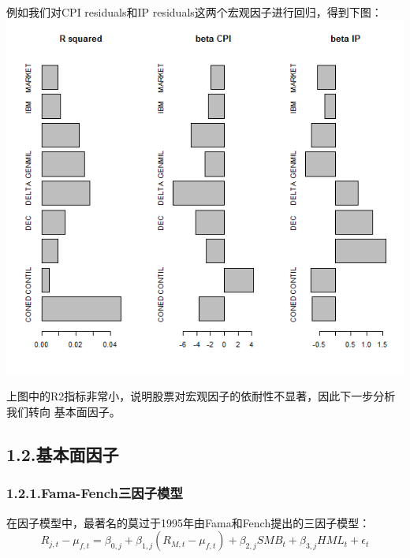 \documentclass{article}
\begin{document}
\noindent{}例如我们对CPI residuals和IP residuals这两个宏观因子进行回归，得到下图：
\includegraphics[keepaspectratio=true,width=\dimmin{}{\dimwidth{0.90}}]{images/Rplot}{}%

\noindent{}上图中的R2指标非常小，说明股票对宏观因子的依耐性不显著，因此下一步分析我们转向
基本面因子。%

\subsection{1.2.\hspace*{0.5em}基本面因子}\label{section}%

\subsubsection{1.2.1.\hspace*{0.5em}Fama-Fench三因子模型}\label{sec-fama-fench}%

\noindent{}在因子模型中，最著名的莫过于1995年由Fama和Fench提出的三因子模型：%
\label{}%
\noindent{}
\noindent\[%
R_{j,t}-\mu_{f,t} = \beta_{0,j}+\beta_{1,j}(R_{M,t}-\mu_{f,t})+\beta_{2,j}SMB_t+\beta_{3,j}HML_t+\epsilon_t
\]%
\end{document}
